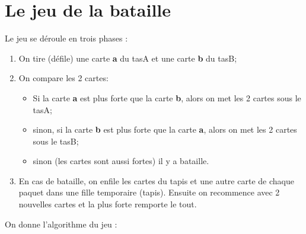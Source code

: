 \documentclass[11pt,a4paper]{article}
\begin{document}
\section{Le jeu de la bataille}
Le jeu se déroule en trois phases :
\begin{enumerate}
\item On tire (défile) une carte \textbf{a} du tasA et une carte \textbf{b} du tasB;
\item On compare les 2 cartes:
\begin{itemize}
\item Si la carte \textbf{a} est plus forte que la carte \textbf{b}, alors on met les 2 cartes sous le tasA;
\item sinon, si la carte \textbf{b} est plus forte que la carte \textbf{a}, alors on met les 2 cartes sous le tasB;
\item sinon (les cartes sont aussi fortes) il y a bataille.
\end{itemize}
\item En cas de bataille, on enfile les cartes du tapis et une autre carte de chaque paquet dans une fille temporaire (tapis). Ensuite on recommence avec 2 nouvelles cartes et la plus forte remporte le tout.
\end{enumerate}

\newpage
On donne l'algorithme du jeu :
\end{document}
